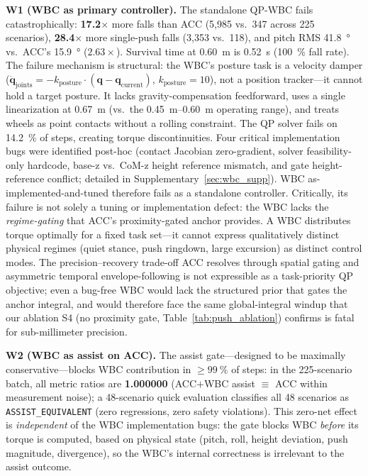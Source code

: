 \medskip\noindent\textbf{W1 (WBC as primary controller).}
The standalone QP-WBC fails catastrophically: \textbf{\num{17.2}$\times$} more falls than ACC (5{,}985 vs.\ 347 across 225 scenarios), \textbf{\num{28.4}$\times$} more single-push falls (3{,}353 vs.\ 118), and pitch RMS \SI{41.8}{\degree} vs.\ ACC's \SI{15.9}{\degree} ($\num{2.63}\times$).
Survival time at \SI{0.60}{m} is \SI{0.52}{s} (\SI{100}{\percent} fall rate).
The failure mechanism is structural: the WBC's posture task is a velocity damper ($\ddot{\mathbf{q}}_{\text{joints}} = -k_{\text{posture}}\!\cdot\!(\mathbf{q} - \mathbf{q}_{\text{current}})$, $k_{\text{posture}}{=}10$), not a position tracker---it cannot hold a target posture.
It lacks gravity-compensation feedforward, uses a single linearization at \SI{0.67}{m} (vs.\ the \SIrange{0.45}{0.60}{m} operating range), and treats wheels as point contacts without a rolling constraint.
The QP solver fails on \SI{14.2}{\percent} of steps, creating torque discontinuities.
Four critical implementation bugs were identified post-hoc (contact Jacobian zero-gradient, solver feasibility-only hardcode, base-z vs.\ CoM-z height reference mismatch, and gate height-reference conflict; detailed in Supplementary~\ref{sec:wbc_supp}).
WBC as-implemented-and-tuned therefore fails as a standalone controller.
Critically, its failure is not solely a tuning or implementation defect: the WBC lacks the \emph{regime-gating} that ACC's proximity-gated anchor provides.
A WBC distributes torque optimally for a fixed task set---it cannot express qualitatively distinct physical regimes (quiet stance, push ringdown, large excursion) as distinct control modes.
The precision--recovery trade-off ACC resolves through spatial gating and asymmetric temporal envelope-following is not expressible as a task-priority QP objective; even a bug-free WBC would lack the structured prior that gates the anchor integral, and would therefore face the same global-integral windup that our ablation S4 (no proximity gate, Table~\ref{tab:push_ablation}) confirms is fatal for sub-millimeter precision.

\medskip\noindent\textbf{W2 (WBC as assist on ACC).}
The assist gate---designed to be maximally conservative---blocks WBC contribution in ${\ge}\SI{99}{\percent}$ of steps:
in the 225-scenario batch, all metric ratios are \textbf{\num{1.000000}} (ACC$+$WBC assist $\equiv$ ACC within measurement noise); a 48-scenario quick evaluation classifies all 48 scenarios as \texttt{ASSIST\_EQUIVALENT} (zero regressions, zero safety violations).
This zero-net effect is \emph{independent} of the WBC implementation bugs: the gate blocks WBC \emph{before} its torque is computed, based on physical state (pitch, roll, height deviation, push magnitude, divergence), so the WBC's internal correctness is irrelevant to the assist outcome.

